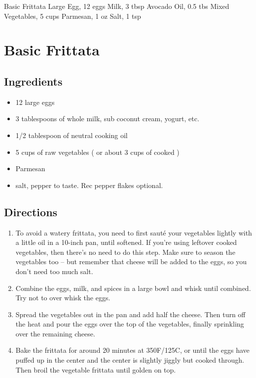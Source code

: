 Basic Frittata
  Large Egg, 12 eggs
  Milk, 3 tbsp
  Avocado Oil, 0.5 tbs
  Mixed Vegetables, 5 cups
  Parmesan, 1 oz
  Salt, 1 tsp

\section{ Basic Frittata }

\subsection{ Ingredients }

\begin{itemize}
  \item 12 large eggs
  \item 3 tablespoons of whole milk, sub coconut cream, yogurt, etc.
  \item 1/2 tablespoon of neutral cooking oil
  \item 5 cups of raw vegetables ( or about 3 cups of cooked )
  \item Parmesan
  \item salt, pepper to taste. Rec pepper flakes optional.
\end{itemize}

\subsection{ Directions }

\begin{enumerate}
  \item To avoid a watery frittata, you need to first sauté your vegetables lightly with a little oil in a 10-inch pan, until softened. If you’re using leftover cooked vegetables, then there’s no need to do this step. Make sure to season the vegetables too – but remember that cheese will be added to the eggs, so you don’t need too much salt.
  \item Combine the eggs, milk, and spices in a large bowl and whisk until combined. Try not to over whisk the eggs.
  \item Spread the vegetables out in the pan and add half the cheese. Then turn off the heat and pour the eggs over the top of the vegetables, finally sprinkling over the remaining cheese.
  \item Bake the frittata for around 20 minutes at 350F/125C, or until the eggs have puffed up in the center and the center is slightly jiggly but cooked through. Then broil the vegetable frittata until golden on top.
\end{enumerate}
